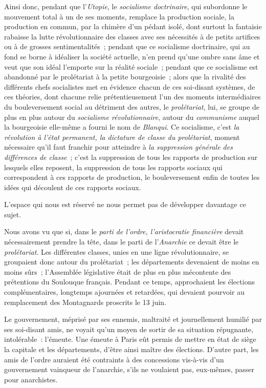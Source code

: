 \documentclass[twoside]{book} %
\begin{document}
Ainsi donc, pendant que l’\emph{Utopie}, le \emph{socialisme doctrinaire}, qui subordonne le mouvement total à un de ses moments, remplace la production sociale, la production en commun, par la chimère d’un pédant isolé, dont surtout la fantaisie rabaisse la lutte révolutionnaire des classes avec ses nécessités à de petits artifices ou à de grosses sentimentalités ; pendant que ce socialisme doctrinaire, qui au fond se borne à idéaliser la société actuelle, n’en prend qu’une ombre sans âme et veut que son idéal l’emporte sur la réalité sociale ; pendant que ce socialisme est abandonné par le prolétariat à la petite bourgeoisie ; alors que la rivalité des différents chefs socialistes met en évidence chacun de ces soi-disant systèmes, de ces théories, dont chacune relie prétentieusement l’un des moments intermédiaires du bouleversement social au détriment des autres, le \emph{prolétariat}, lui, se groupe de plus en plus autour du \emph{socialisme révolutionnaire}, autour du \emph{communisme} auquel la bourgeoisie elle-même a fourni le nom de \emph{Blanqui}. Ce socialisme, c’est \emph{la révolution à l’état permanent, la dictature de classe du prolétariat}, moment nécessaire qu’il faut franchir pour atteindre à \emph{la suppression générale des différences de classe} ; c’est la suppression de tous les rapports de production sur lesquels elles reposent, la suppression de tous les rapports sociaux qui correspondent à ces rapports de production, le bouleversement enfin de toutes les idées qui découlent de ces rapports sociaux.\par
L’espace qui nous est réservé ne nous permet pas de développer davantage ce sujet.\par
Nous avons vu que si, dans le \emph{parti de l’ordre, l’aristocratie financière} devait nécessairement prendre la tête, dans le parti de l’\emph{Anarchie} ce devait être le \emph{prolétariat}. Les différentes classes, unies en une ligne révolutionnaire, se groupaient donc autour du prolétariat ; les départements devenaient de moins en moins sûrs ; l’Assemblée législative était de plus en plus mécontente des prétentions du Soulouque français. Pendant ce temps, approchaient les élections complémentaires, longtemps ajournées et retardées, qui devaient pourvoir au remplacement des Montagnards proscrits le 13 juin.\par
Le gouvernement, méprisé par ses ennemis, maltraité et journellement humilié par ses soi-disant amis, ne voyait qu’un moyen de sortir de sa situation répugnante, intolérable : l’émeute. Une émeute à Paris eût permis de mettre en état de siège la capitale et les départements, d’être ainsi maître des élections. D’autre part, les amis de l’ordre auraient été contraints à des concessions vis-à-vis d’un gouvernement vainqueur de l’anarchie, s’ils ne voulaient pas, eux-mêmes, passer pour anarchistes.\par
\end{document}
